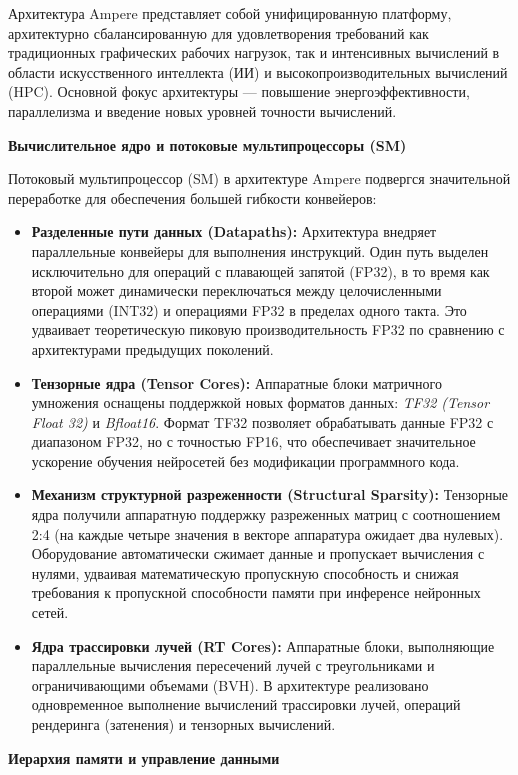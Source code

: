 \documentclass{article}[14pt]
\begin{document}
Архитектура Ampere представляет собой унифицированную платформу, архитектурно сбалансированную для удовлетворения требований как традиционных графических рабочих нагрузок, так и интенсивных вычислений в области искусственного интеллекта (ИИ) и высокопроизводительных вычислений (HPC). Основной фокус архитектуры — повышение энергоэффективности, параллелизма и введение новых уровней точности вычислений.

\medskip \noindent \textbf{Вычислительное ядро и потоковые мультипроцессоры (SM)}

Потоковый мультипроцессор (SM) в архитектуре Ampere подвергся значительной переработке для обеспечения большей гибкости конвейеров:
\begin{itemize}
    \item \textbf{Разделенные пути данных (Datapaths):} Архитектура внедряет параллельные конвейеры для выполнения инструкций. Один путь выделен исключительно для операций с плавающей запятой (FP32), в то время как второй может динамически переключаться между целочисленными операциями (INT32) и операциями FP32 в пределах одного такта. Это удваивает теоретическую пиковую производительность FP32 по сравнению с архитектурами предыдущих поколений.
    \item \textbf{Тензорные ядра (Tensor Cores):} Аппаратные блоки матричного умножения оснащены поддержкой новых форматов данных: \textit{TF32 (Tensor Float 32)} и \textit{Bfloat16}. Формат TF32 позволяет обрабатывать данные FP32 с диапазоном FP32, но с точностью FP16, что обеспечивает значительное ускорение обучения нейросетей без модификации программного кода.
    \item \textbf{Механизм структурной разреженности (Structural Sparsity):} Тензорные ядра получили аппаратную поддержку разреженных матриц с соотношением 2:4 (на каждые четыре значения в векторе аппаратура ожидает два нулевых). Оборудование автоматически сжимает данные и пропускает вычисления с нулями, удваивая математическую пропускную способность и снижая требования к пропускной способности памяти при инференсе нейронных сетей.
    \item \textbf{Ядра трассировки лучей (RT Cores):} Аппаратные блоки, выполняющие параллельные вычисления пересечений лучей с треугольниками и ограничивающими объемами (BVH). В архитектуре реализовано одновременное выполнение вычислений трассировки лучей, операций рендеринга (затенения) и тензорных вычислений.
\end{itemize}

\medskip \noindent \textbf{Иерархия памяти и управление данными}
\end{document}
